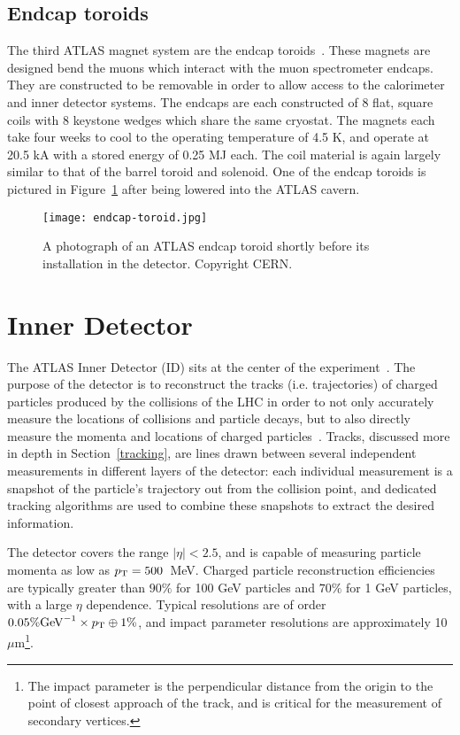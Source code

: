 
\subsection{Endcap toroids}

The third ATLAS magnet system are the endcap toroids~\cite{ATLASPaper,ATLASMS}. These magnets are designed bend the muons which interact with the muon spectrometer endcaps. They are constructed to be removable in order to allow access to the calorimeter and inner detector systems. The endcaps are each constructed of 8 flat, square coils with 8 keystone wedges which share the same cryostat. The magnets each take four weeks to cool to the operating temperature of 4.5 K, and operate at 20.5 kA with a stored energy of 0.25 MJ each. The coil material is again largely similar to that of the barrel toroid and solenoid. One of the endcap toroids is pictured in Figure~\ref{fig:detector:endcap-toroid} after being lowered into the ATLAS cavern.



\begin{figure}
\centering
\texttt{[image: endcap-toroid.jpg]}
\caption{A photograph of an ATLAS endcap toroid shortly before its installation in the detector. Copyright CERN.}
\label{fig:detector:endcap-toroid}
\end{figure}



\section{Inner Detector}

The ATLAS Inner Detector (ID) sits at the center of the experiment~\cite{ATLASPaper}. The purpose of the detector is to reconstruct the tracks (i.e. trajectories) of charged particles produced by the collisions of the LHC in order to not only accurately measure the locations of collisions and particle decays, but to also directly measure the momenta and locations of charged particles~\cite{ATLASExpected}. Tracks, discussed more in depth in Section~\ref{tracking}, are lines drawn between several independent measurements in different layers of the detector: each individual measurement is a snapshot of the particle's trajectory out from the collision point, and dedicated tracking algorithms are used to combine these snapshots to extract the desired information.

The detector covers the range $|\eta| < 2.5$, and is capable of measuring particle momenta as low as $p_{\text{T}} = 500$~MeV. Charged particle reconstruction efficiencies are typically greater than $90\%$ for 100 GeV particles and $70\%$ for 1 GeV particles, with a large $\eta$ dependence. Typical \pT resolutions are of order $0.05\% \mathrm{GeV}^{-1} \times p_{\text{T}} \oplus 1\%$, and impact parameter resolutions are approximately 10 $\mu$m\footnote{The impact parameter is the perpendicular distance from the origin to the point of closest approach of the track, and is critical for the measurement of secondary vertices.}. 

